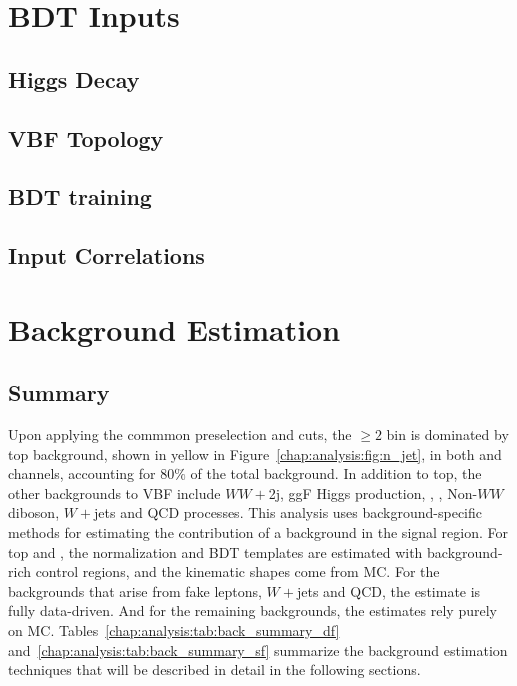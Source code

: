 \section{BDT Inputs}

\subsection{Higgs Decay}

\subsection{VBF Topology}

\subsection{BDT training}

\subsection{Input Correlations}

\section{Background Estimation}

\subsection{Summary}

Upon applying the commmon preselection and \etmiss cuts, the \Njet$\geq{2}$ bin is
dominated by top background, shown in yellow in
Figure~\ref{chap:analysis:fig:n_jet}, in both \emme and \eemm
channels, accounting for 80$\%$ of the
total background. In addition to top, the other backgrounds to VBF
include $WW+$2j, ggF Higgs production, \ZDYll, \Ztautau, Non-$WW$
diboson, $W+$jets and QCD processes. This analysis uses
background-specific methods for estimating the contribution of a
background in the signal region. For top and \ZDY, the normalization
and BDT templates are estimated with background-rich control regions,
and the kinematic shapes come from MC. For the backgrounds that arise
from fake leptons, $W+$jets and QCD, the estimate is fully
data-driven. And for the remaining backgrounds, the estimates rely
purely on MC. Tables~\ref{chap:analysis:tab:back_summary_df}
and~\ref{chap:analysis:tab:back_summary_sf} summarize the background
estimation techniques that will be described in detail in the
following sections. 

